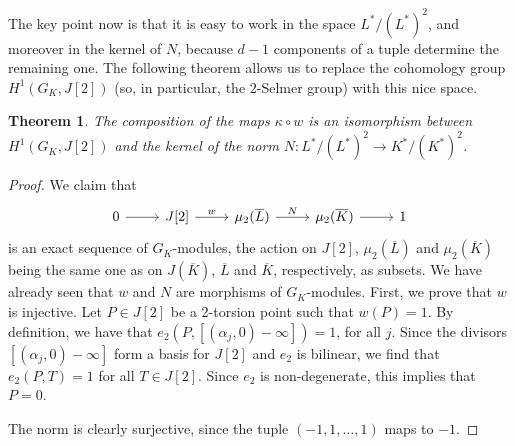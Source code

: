 \documentclass[a4paper, 12pt]{amsart}
\theoremstyle{definition}
\theoremstyle{plain}
\theoremstyle{plain}
\newtheorem{thm0}[defn0]{Theorem}
\theoremstyle{plain}
\theoremstyle{plain}
\theoremstyle{remark}
\theoremstyle{remark}
\theoremstyle{plain}
\newenvironment{theorem}{ \begin{thm0}}{\end{thm0}}
\begin{document}
	The key point now is that it is easy to work in the space $L^*/(L^*)^2$, and moreover in the kernel of $N$, because $d-1$ components of a tuple determine the remaining one. The following theorem allows us to replace the cohomology group $H^1(G_K,J[2])$ (so, in particular, the $2$-Selmer group) with this nice space.
	\begin{theorem}\label{kwisomorphism}
		The composition of the maps $\kappa\circ w$ is an isomorphism between $H^1(G_K,J[2])$ and the kernel of the norm $N:L^*/(L^*)^2\rightarrow K^*/(K^*)^2$.
	\end{theorem}
	\begin{proof}
		We claim that
		\begin{equation*}
			\begin{tikzcd}
				0\arrow{r}
				&J[2]\arrow{r}{w}
				&\mu_2(\overline{L})\arrow{r}{N}
				&\mu_2(\overline{K})\arrow{r}
				&1
			\end{tikzcd}
		\end{equation*}
		is an exact sequence of $G_K$-modules, the action on $J[2]$, $\mu_2(\overline{L})$ and $\mu_2(\overline{K})$ being the same one as on $J(\overline{K})$, $\overline{L}$ and $\overline{K}$, respectively, as subsets. We have already seen that $w$ and $N$ are morphisms of $G_K$-modules. First, we prove that $w$ is injective. Let $P\in J[2]$ be a 2-torsion point such that $w(P)=1$. By definition, we have that $e_2(P,[(\alpha_j,0)-\infty])=1$, for all $j$. Since the divisors $[(\alpha_j,0)-\infty]$ form a basis for $J[2]$ and $e_2$ is bilinear, we find that $e_2(P,T)=1$ for all $T\in J[2]$. Since $e_2$ is non-degenerate, this implies that $P=0$.
		
		The norm is clearly surjective, since the tuple $(-1,1,\ldots,1)$ maps to $-1$.
		

\end{proof}
\end{document}
